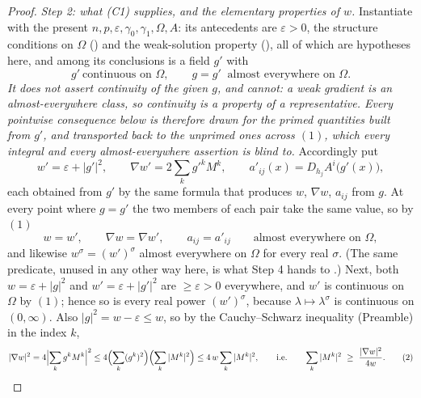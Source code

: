 \begin{proof}
\emph{Step 2: what (C1) supplies, and the elementary properties of $w$.}
Instantiate  with the present
$n,p,\varepsilon,\gamma_0,\gamma_1,\Omega,A$: its antecedents are
$\varepsilon>0$, the structure conditions on $\Omega$
() and the weak-solution property
(), all of which are hypotheses here, and among its
conclusions is a field $g'$ with
\[
g'\ \text{continuous on }\Omega,
\qquad
g=g'\ \text{ almost everywhere on }\Omega .
\tag{1}
\]
\emph{It does not assert continuity of the given $g$, and cannot: a weak
gradient is an almost-everywhere class, so continuity is a property of a
representative.  Every \emph{pointwise} consequence below is therefore drawn for
the primed quantities built from $g'$, and transported back to the unprimed ones
across $(1)$, which every integral and every almost-everywhere assertion is
blind to.}  Accordingly put
\[
w'=\varepsilon+|g'|^2,\qquad
\nabla w'=2\sum_kg'^kM^k,\qquad
a'_{ij}(x)=D_{h_j}A^i\bigl(g'(x)\bigr),
\]
each obtained from $g'$ by the same formula that produces $w$, $\nabla w$,
$a_{ij}$ from $g$.  At every point where $g=g'$ the two members of each pair
take the same value, so by $(1)$
\[
w=w',\qquad \nabla w=\nabla w',\qquad a_{ij}=a'_{ij}
\qquad\text{almost everywhere on }\Omega ,
\tag{1$'$}
\]
and likewise $w^\sigma=(w')^\sigma$ almost everywhere on $\Omega$ for every real
$\sigma$.
(The same predicate, unused in any other way here, is what Step 4 hands to
.)  Next, both $w=\varepsilon+|g|^2$ and
$w'=\varepsilon+|g'|^2$ are $\ge\varepsilon>0$ everywhere, and $w'$ is
continuous on $\Omega$ by $(1)$; hence so is every real power $(w')^\sigma$,
because $\lambda\mapsto\lambda^\sigma$ is continuous on $(0,\infty)$.  Also
$|g|^2=w-\varepsilon\le w$, so by the Cauchy--Schwarz inequality (Preamble) in
the index $k$,
\[
|\nabla w|^2=4\Bigl|\sum_kg^kM^k\Bigr|^2
\le4\Bigl(\sum_k(g^k)^2\Bigr)\Bigl(\sum_k|M^k|^2\Bigr)
\le4\,w\sum_k|M^k|^2 ,
\qquad\text{i.e.}\qquad
\sum_k|M^k|^2\ \ge\ \frac{|\nabla w|^2}{4w} .
\tag{2}
\]


\end{proof}
